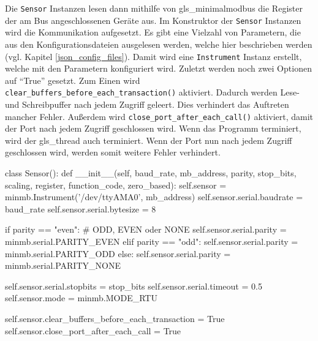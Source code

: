 Die \lstinline{Sensor} Instanzen lesen dann mithilfe von \gls{gls_minimalmodbus} die Register der am Bus angeschlossenen Geräte aus. Im Konstruktor der \lstinline{Sensor} Instanzen wird die Kommunikation aufgesetzt. Es gibt eine Vielzahl von Parametern, die aus den Konfigurationsdateien ausgelesen werden, welche hier beschrieben werden (vgl. Kapitel \ref{json_config_files}). Damit wird eine \lstinline{Instrument} Instanz erstellt, welche mit den Parametern konfiguriert wird. Zuletzt werden noch zwei Optionen auf \enquote{True} gesetzt. Zum Einen wird \lstinline{clear_buffers_before_each_transaction()} aktiviert. Dadurch werden Lese- und Schreibpuffer nach jedem Zugriff geleert. Dies verhindert das Auftreten mancher Fehler. Außerdem wird \lstinline{close_port_after_each_call()} aktiviert, damit der Port nach jedem Zugriff geschlossen wird. Wenn das Programm terminiert, wird der \gls{gls_thread} auch terminiert. Wenn der Port nun nach jedem Zugriff geschlossen wird, werden somit weitere Fehler verhindert.

\begin{pythoncode}
class Sensor():
	def __init__(self, baud_rate, mb_address, parity, stop_bits, scaling, register, function_code, zero_based):
		self.sensor = minmb.Instrument('/dev/ttyAMA0', mb_address)
		self.sensor.serial.baudrate = baud_rate
		self.sensor.serial.bytesize = 8
		
		if parity == "even":  # ODD, EVEN oder NONE
			self.sensor.serial.parity = minmb.serial.PARITY_EVEN
		elif parity == "odd":
			self.sensor.serial.parity = minmb.serial.PARITY_ODD
		else:
			self.sensor.serial.parity = minmb.serial.PARITY_NONE
		
		self.sensor.serial.stopbits = stop_bits
		self.sensor.serial.timeout = 0.5
		self.sensor.mode = minmb.MODE_RTU
		
		self.sensor.clear_buffers_before_each_transaction = True
		self.sensor.close_port_after_each_call = True
\end{pythoncode}


